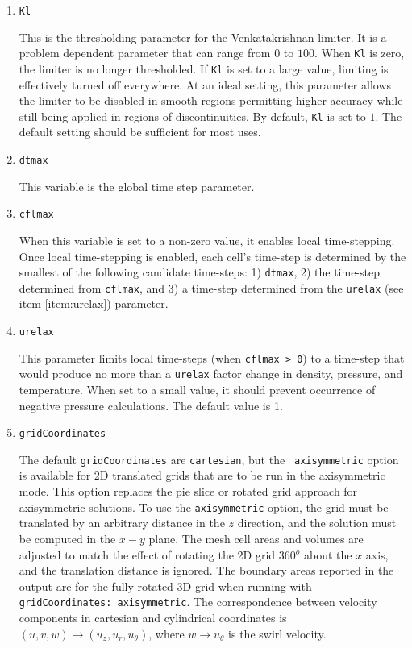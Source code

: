 \documentclass{article}
\begin{document}
\begin{enumerate}
\item {\tt Kl}
  
  This is the thresholding parameter for the Venkatakrishnan limiter.
  It is a problem dependent parameter that can range from $0$ to
  $100$.  When {\tt Kl} is zero, the limiter is no longer
  thresholded.  If {\tt Kl} is set to a large value, limiting is
  effectively turned off everywhere.  At an ideal setting, this
  parameter allows the limiter to be disabled in smooth regions
  permitting higher accuracy while still being applied in regions of
  discontinuities.  By default, {\tt Kl} is set to $1$.  The default
  setting should be sufficient for most uses.

\item {\tt dtmax}
  
  This variable is the global time step parameter.  

\item {\tt cflmax} 
  
  When this variable is set to a non-zero value, it enables local
  time-stepping.  Once local time-stepping is enabled, each cell's
  time-step is determined by the smallest of the following
  candidate time-steps:  1) {\tt dtmax}, 2) the time-step determined
  from {\tt cflmax}, and 3) a time-step determined from the {\tt urelax}
  (see item \ref{item:urelax}) parameter.

\item {\tt urelax} \label{item:urelax}

  This parameter limits local time-steps (when {\tt cflmax > 0})
  to a time-step that would produce no more than a {\tt urelax} factor
  change in density, pressure, and temperature.  When set to a small
  value, it should prevent occurrence of negative pressure calculations.
  The default value is 1.

\item {\tt gridCoordinates}

  The default {\tt gridCoordinates} are {\tt cartesian}, but the {\tt
    axisymmetric} option is available for 2D translated grids that are
  to be run in the axisymmetric mode.  This option replaces the pie
  slice or rotated grid approach for axisymmetric solutions.  To use
  the {\tt axisymmetric} option, the grid must be translated by an
  arbitrary distance in the $z$ direction, and the solution must be
  computed in the $x-y$ plane.  The mesh cell areas and volumes are
  adjusted to match the effect of rotating the 2D grid 360$^o$ about
  the $x$ axis, and the translation distance is ignored.  The boundary
  areas reported in the output are for the fully rotated 3D grid when
  running with {\tt gridCoordinates: axisymmetric}.  The
  correspondence between velocity components in cartesian and
  cylindrical coordinates is $(u, v, w) \rightarrow (u_z, u_r,
  u_{\theta})$, where $w \rightarrow u_{\theta}$ is the swirl
  velocity.



\end{enumerate}
\end{document}
